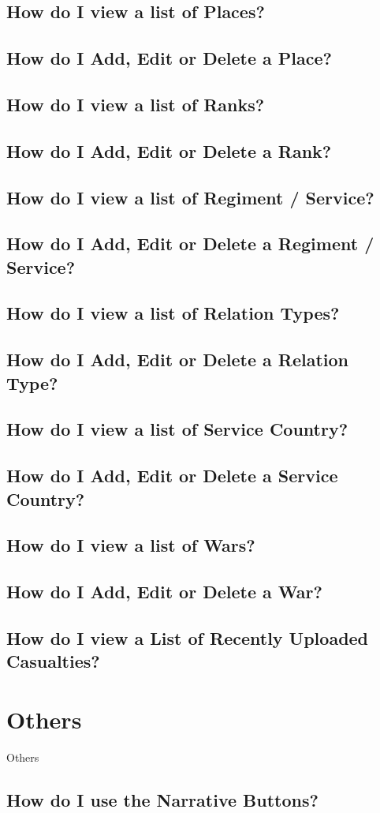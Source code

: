 \documentclass[12pt]{article}
\begin{document}
\subsection{How do I view a list of Places?}
\subsection{How do I Add, Edit or Delete a Place?}
\subsection{How do I view a list of Ranks?}
\subsection{How do I Add, Edit or Delete a Rank?}
\subsection{How do I view a list of Regiment / Service?}
\subsection{How do I Add, Edit or Delete a Regiment / Service?}
\subsection{How do I view a list of Relation Types?}
\subsection{How do I Add, Edit or Delete a Relation Type?}
\subsection{How do I view a list of Service Country?}
\subsection{How do I Add, Edit or Delete a Service Country?}
\subsection{How do I view a list of Wars?}
\subsection{How do I Add, Edit or Delete a War?}
\subsection{How do I view a List of Recently Uploaded Casualties?}

\section{Others}
Others
\subsection{How do I use the Narrative Buttons?}\label{ssec:narrative}
\end{document}
